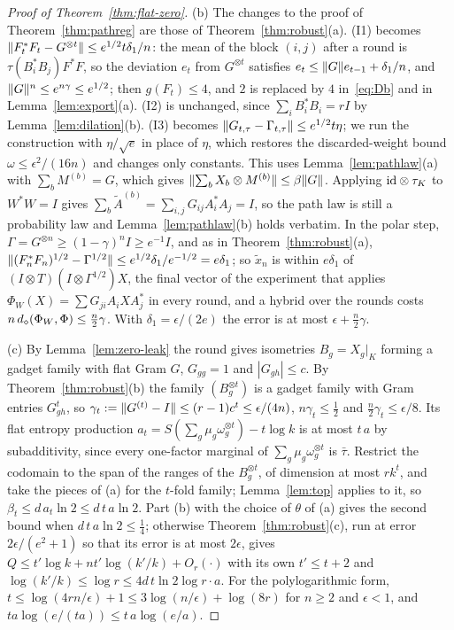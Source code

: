 \begin{proof}[Proof of Theorem~\ref{thm:flat-zero}]
(b) The changes to the proof of Theorem~\ref{thm:pathreg} are those of Theorem~\ref{thm:robust}(a). (I1) becomes $\lVert F_t^*F_t-G^{\otimes t}\rVert\le e^{1/2}t\delta_1/n$:
the mean of the block $(i,j)$ after a round is $\tau(B_i^*B_j)F^*F$, so the deviation $e_t$ from $G^{\otimes t}$ satisfies $e_t\le\lVert G\rVert e_{t-1}+\delta_1/n$, and
$\lVert G\rVert^n\le e^{n\gamma}\le e^{1/2}$; then $g(F_t)\le4$, and $2$ is replaced by $4$ in~\eqref{eq:Db} and in Lemma~\ref{lem:export}(a). (I2) is unchanged, since
$\sum_iB_i^*B_i=rI$ by Lemma~\ref{lem:dilation}(b). (I3) becomes $\lVert G_{t,\tau}-\Gamma_{t,\tau}\rVert\le e^{1/2}t\eta$; we run the construction with $\eta/\sqrt e$ in place of $\eta$, which
restores the discarded-weight bound $\omega\le\epsilon^2/(16n)$ and changes only constants. This uses Lemma~\ref{lem:pathlaw}(a) with
$\sum_bM^{(b)}=G$, which gives $\lVert \sum_bX_b\otimes M^{(b)}\rVert\le\beta\lVert G\rVert$. Applying $\mathrm{id}\otimes\tau_K$ to $W^*W=I$ gives
$\sum_b\widetilde A^{(b)}=\sum_{i,j}G_{ij}A_i^*A_j=I$, so the path law is still a probability law and Lemma~\ref{lem:pathlaw}(b) holds verbatim. In the polar step,
$\Gamma=G^{\otimes n}\ge(1-\gamma)^nI\ge e^{-1}I$, and as in Theorem~\ref{thm:robust}(a), $\lVert (F_n^*F_n)^{1/2}-\Gamma^{1/2}\rVert\le e^{1/2}\delta_1/e^{-1/2}=e\delta_1$; so
$\tilde x_n$ is within $e\delta_1$ of $(I\otimes T)(I\otimes\Gamma^{1/2})X$, the final vector of the experiment that applies $\Phi_W(X)=\sum G_{ji}A_iXA_j^*$ in every round, and a
hybrid over the rounds costs $n\,d_\diamond(\Phi_W,\Phi)\le\frac n2\gamma$. With $\delta_1=\epsilon/(2e)$ the error is at most $\epsilon+\frac n2\gamma$.

(c) By Lemma~\ref{lem:zero-leak} the round gives isometries $B_g=X_g|_K$ forming a gadget family with flat Gram $G$, $G_{gg}=1$ and $|G_{gh}|\le c$. By
Theorem~\ref{thm:robust}(b) the family $(B_g^{\otimes t})$ is a gadget family with Gram entries $G_{gh}^t$, so $\gamma_t:=\lVert G^{(t)}-I\rVert\le(r-1)c^t\le\epsilon/(4n)$,
$n\gamma_t\le\frac12$ and $\frac n2\gamma_t\le\epsilon/8$. Its flat entropy production $a_t=S(\sum_g\mu_g\omega_g^{\otimes t})-t\log k$ is at most $t\,a$ by subadditivity,
since every one-factor marginal of $\sum_g\mu_g\omega_g^{\otimes t}$ is $\bar\tau$. Restrict the codomain to the span of the ranges of the $B_g^{\otimes t}$, of dimension at
most $rk^t$, and take the pieces of (a) for the $t$-fold family; Lemma~\ref{lem:top} applies to it, so $\beta_t\le d\,a_t\ln2\le d\,t\,a\ln2$. Part (b) with the choice of
$\theta$ of (a) gives the second bound when $d\,t\,a\ln2\le\frac14$; otherwise Theorem~\ref{thm:robust}(c), run at error $2\epsilon/(e^2+1)$ so that
its error is at most $2\epsilon$, gives $Q\le t'\log k+nt'\log(k'/k)+O_r(\cdot)$ with its own $t'\le t+2$ and
$\log(k'/k)\le\log r\le4d\,t\ln2\log r\cdot a$. For the polylogarithmic form, $t\le\log(4rn/\epsilon)+1\le3\log(n/\epsilon)+\log(8r)$ for $n\ge2$ and $\epsilon<1$, and
$ta\log(e/(ta))\le t\,a\log(e/a)$.
\end{proof}
